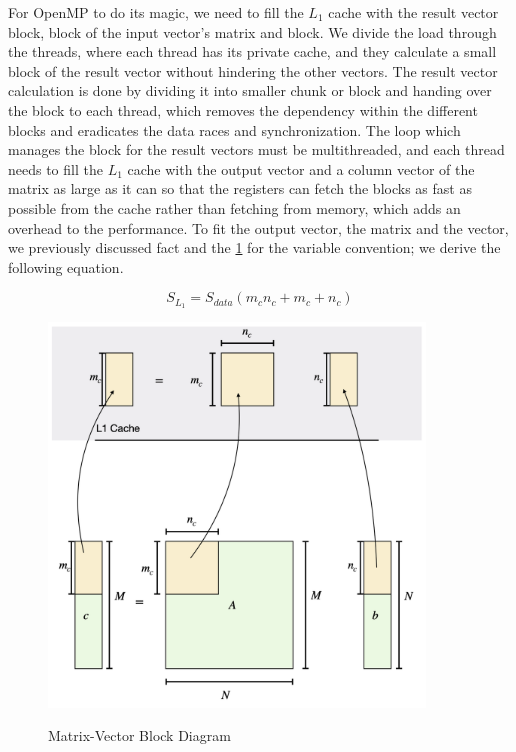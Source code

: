For OpenMP to do its magic, we need to fill the $L_1$ cache with 
the result vector block, block of the input vector's matrix and block. 
We divide the load through the threads, where each thread has 
its private cache, and they calculate a small block of the 
result vector without hindering the other vectors. 
The result vector calculation is done by dividing it into 
smaller chunk or block and handing over the block to each thread, 
which removes the dependency within the different blocks and 
eradicates the data races and synchronization. 
The loop which manages the block for the result 
vectors must be multithreaded, and each thread needs to fill 
the $L_1$ cache with the output vector and a column vector of the matrix 
as large as it can so that the registers can fetch the blocks as fast 
as possible from the cache rather than fetching from memory, which adds 
an overhead to the performance. To fit the output vector, the matrix and the vector, 
we previously discussed fact and the \ref{fig:mtv_col_block_diagram} 
for the variable convention; we derive the following equation.

\begin{equation}
    S_{L_1} = S_{data}(m_cn_c + m_c + n_c)
    \label{eq:mtv_col_block} 
\end{equation}

\begin{figure}[htb]
    \centering
    \caption{Matrix-Vector Block Diagram}
    \includegraphics[width=10cm]{../assets/mtv/col_major/block_diagram.png} %
    \label{fig:mtv_col_block_diagram}
\end{figure}



